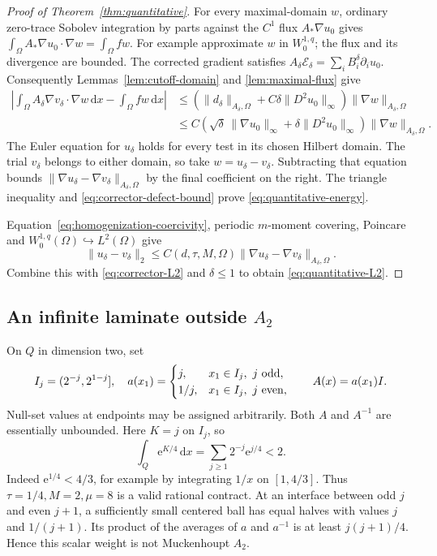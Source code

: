 \documentclass[11pt,a4paper]{article}
\numberwithin{equation}{section}
\theoremstyle{definition}
\theoremstyle{remark}\newtheorem{remark}[theorem]{Remark}
\newcommand{\ee}{\mathrm e}
\newcommand{\Id}{I}
\newcommand{\dd}{\,\mathrm dx}
\newcommand{\norm}[1]{\lVert #1\rVert}
\begin{document}
\begin{proof}[Proof of Theorem~\ref{thm:quantitative}]
For every maximal-domain \(w\), ordinary zero-trace Sobolev
integration by parts against the \(C^1\) flux \(A_*\nabla u_0\)
gives
\(\int_\Omega A_*\nabla u_0\cdot\nabla w=\int_\Omega fw\).
For example approximate \(w\) in \(W^{1,q}_0\); the flux and its
divergence are bounded. The corrected gradient satisfies
\(A_\delta\mathcal E_\delta=\sum_iB_i^\delta\partial_i u_0\).
Consequently Lemmas~\ref{lem:cutoff-domain} and
\ref{lem:maximal-flux} give
\begin{align*}
 \left|\int_\Omega A_\delta\nabla v_\delta\cdot\nabla w\dd
                         -\int_\Omega fw\dd\right|
 &\leq
 \left(\norm{d_\delta}_{A_\delta,\Omega}
                   +C\delta\norm{D^2u_0}_\infty\right)
                       \norm{\nabla w}_{A_\delta,\Omega}\\
 &\leq C\left(\sqrt\delta\,\norm{\nabla u_0}_\infty
                 +\delta\norm{D^2u_0}_\infty\right)
                       \norm{\nabla w}_{A_\delta,\Omega}.
\end{align*}
The Euler equation for \(u_\delta\) holds for every test in
its chosen Hilbert domain. The trial \(v_\delta\) belongs
to either domain, so take \(w=u_\delta-v_\delta\).
Subtracting that equation bounds
\(\norm{\nabla u_\delta-\nabla v_\delta}_{A_\delta,\Omega}\)
by the final coefficient on the right. The triangle inequality
and \eqref{eq:corrector-defect-bound} prove
\eqref{eq:quantitative-energy}.

Equation~\eqref{eq:homogenization-coercivity}, periodic
\(m\)-moment covering, Poincare and
\(W^{1,q}_0(\Omega)\hookrightarrow L^2(\Omega)\) give
\[
 \norm{u_\delta-v_\delta}_2
 \leq C(d,\tau,M,\Omega)
              \norm{\nabla u_\delta-\nabla v_\delta}_{A_\delta,\Omega}.
\]
Combine this with \eqref{eq:corrector-L2} and \(\delta\leq1\)
to obtain \eqref{eq:quantitative-L2}.
\end{proof}



\subsection{An infinite laminate outside \texorpdfstring{\(A_2\)}{A2}}

On \(Q\) in dimension two, set
\[
 I_j=(2^{-j},2^{1-j}],\quad
 a(x_1)=
 \begin{cases}j,&x_1\in I_j,\ j\ {\rm odd},\\
               1/j,&x_1\in I_j,\ j\ {\rm even},\end{cases}
 \qquad A(x)=a(x_1)\Id .
\]
Null-set values at endpoints may be assigned arbitrarily.
Both \(A\) and \(A^{-1}\) are essentially unbounded.
Here \(K=j\) on \(I_j\), so
\[
 \int_Q\ee^{K/4}\dd=\sum_{j\geq1}2^{-j}\ee^{j/4}<2.
\]
Indeed \(\ee^{1/4}<4/3\), for example by integrating \(1/x\) on
\([1,4/3]\). Thus \(\tau=1/4,M=2,\mu=8\) is a valid rational contract.
At an interface between odd \(j\) and even \(j+1\), a sufficiently
small centered ball has equal halves with values \(j\) and \(1/(j+1)\).
Its product of the averages of \(a\) and \(a^{-1}\) is at least
\(j(j+1)/4\). Hence this scalar weight is not Muckenhoupt \(A_2\).
\end{document}
